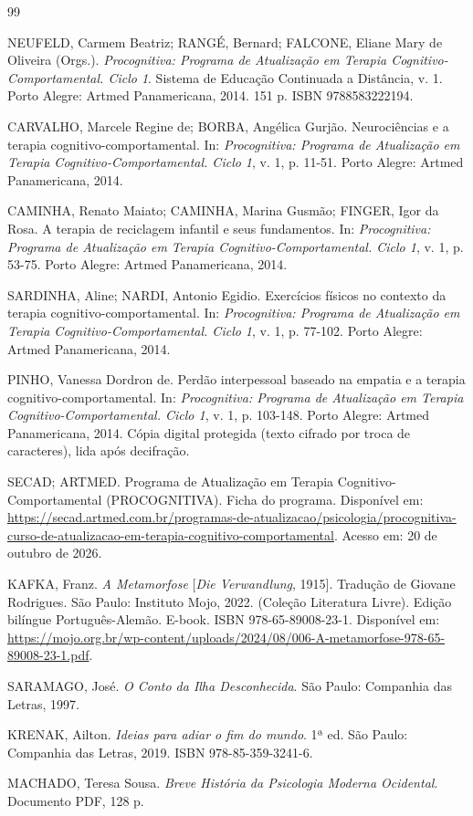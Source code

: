 \documentclass[12pt]{article}
\begin{document}
\begin{thebibliography}{99}

NEUFELD, Carmem Beatriz; RANGÉ, Bernard; FALCONE, Eliane Mary de Oliveira (Orgs.).
\emph{Procognitiva: Programa de Atualização em Terapia Cognitivo-Comportamental. Ciclo 1}.
Sistema de Educação Continuada a Distância, v. 1. Porto Alegre: Artmed Panamericana, 2014. 151 p.
ISBN 9788583222194.

CARVALHO, Marcele Regine de; BORBA, Angélica Gurjão.
Neurociências e a terapia cognitivo-comportamental.
In: \emph{Procognitiva: Programa de Atualização em Terapia Cognitivo-Comportamental. Ciclo 1},
v. 1, p. 11-51. Porto Alegre: Artmed Panamericana, 2014.

CAMINHA, Renato Maiato; CAMINHA, Marina Gusmão; FINGER, Igor da Rosa.
A terapia de reciclagem infantil e seus fundamentos.
In: \emph{Procognitiva: Programa de Atualização em Terapia Cognitivo-Comportamental. Ciclo 1},
v. 1, p. 53-75. Porto Alegre: Artmed Panamericana, 2014.

SARDINHA, Aline; NARDI, Antonio Egidio.
Exercícios físicos no contexto da terapia cognitivo-comportamental.
In: \emph{Procognitiva: Programa de Atualização em Terapia Cognitivo-Comportamental. Ciclo 1},
v. 1, p. 77-102. Porto Alegre: Artmed Panamericana, 2014.

PINHO, Vanessa Dordron de.
Perdão interpessoal baseado na empatia e a terapia cognitivo-comportamental.
In: \emph{Procognitiva: Programa de Atualização em Terapia Cognitivo-Comportamental. Ciclo 1},
v. 1, p. 103-148. Porto Alegre: Artmed Panamericana, 2014.
Cópia digital protegida (texto cifrado por troca de caracteres), lida após decifração.

SECAD; ARTMED.
Programa de Atualização em Terapia Cognitivo-Comportamental (PROCOGNITIVA).
Ficha do programa.
Disponível em: \url{https://secad.artmed.com.br/programas-de-atualizacao/psicologia/procognitiva-curso-de-atualizacao-em-terapia-cognitivo-comportamental}.
Acesso em: 20 de outubro de 2026.

KAFKA, Franz.
\emph{A Metamorfose} [\emph{Die Verwandlung}, 1915].
Tradução de Giovane Rodrigues.
São Paulo: Instituto Mojo, 2022. (Coleção Literatura Livre).
Edição bilíngue Português-Alemão. E-book.
ISBN 978-65-89008-23-1.
Disponível em: \url{https://mojo.org.br/wp-content/uploads/2024/08/006-A-metamorfose-978-65-89008-23-1.pdf}.

SARAMAGO, José.
\emph{O Conto da Ilha Desconhecida}.
São Paulo: Companhia das Letras, 1997.

KRENAK, Ailton.
\emph{Ideias para adiar o fim do mundo}.
1ª ed. São Paulo: Companhia das Letras, 2019.
ISBN 978-85-359-3241-6.

MACHADO, Teresa Sousa.
\emph{Breve História da Psicologia Moderna Ocidental}.
Documento PDF, 128 p.

\end{thebibliography}
\end{document}
